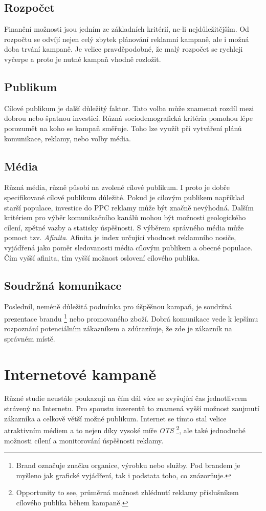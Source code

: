 \documentclass[czech,semestral]{diploma}
\begin{document}
\subsection{Rozpočet}
Finanční možnosti jsou jedním ze základních kritérií, ne-li nejdůležitějším. Od rozpočtu se odvíjí nejen celý zbytek plánování reklamní kampaně, ale i možná
doba trvání kampaně. Je velice pravděpodobné, že malý rozpočet se rychleji vyčerpe a proto je nutné kampaň vhodně rozložit.

\subsection{Publikum}
Cílové publikum je další důležitý faktor. Tato volba může znamenat rozdíl mezi dobrou nebo špatnou investicí. Různá sociodemografická kritéria pomohou lépe porozumět
na koho se kampaň směřuje. Toho lze využít při vytváření plánů komunikace, reklamy, nebo volby média.

\subsection{Média}
Různá média, různě působí na zvolené cílové publikum. I proto je dobře specifikované cílové publikum důležité. Pokud je cilovým publikem například starší populace, investice
do PPC reklamy může být značně nevýhodná. Dalším kritériem pro výběr komunikačního kanálů mohou být možnosti geologického cílení, zpětné vazby a statisky úspěšnosti.
S výběrem správného média může pomoct tzv. \emph{Afinita}. Afinita je index určující vhodnost reklamního nosiče, vyjádřená jako poměr sledovanosti média cílovým publikem
a obecné populace. Čím vyšší afinita, tím vyšší možnost oslovení cílového publika.

\subsection{Soudržná komunikace}
Posledníl, neméně důležitá podmínka pro úšpěšnou kampaň, je soudržná prezentace brandu
\footnote{Brand označuje značku organice, výrobku nebo služby. Pod brandem je myšleno jak grafické vyjádření, tak i podstata toho, co znázorňuje.}
nebo promovaného zboží. Dobrá komunikace vede k lepšímu rozpoznání potenciálním zákazníkem a zdůrazňuje, že zde je zákazník na správném místě.

\section{Internetové kampaně}
Různé studie neustále poukazují na čím dál více se zvyšující čas jednotlivcem strávený na Internetu. Pro spoustu inzerentů to znamená vyšší možnost
zaujmutí zákazníka a celkově větší možné publikum. Internet se tímto stal velice atraktivním médiem a to nejen díky vysoké míře \emph{OTS}
\footnote{Opportunity to see, průměrná možnost zhlédnutí reklamy příslušníkem cílového publika během kampaně.},
ale také jednoduché možnosti cílení a monitorování úspěšnosti reklamy.
\end{document}
